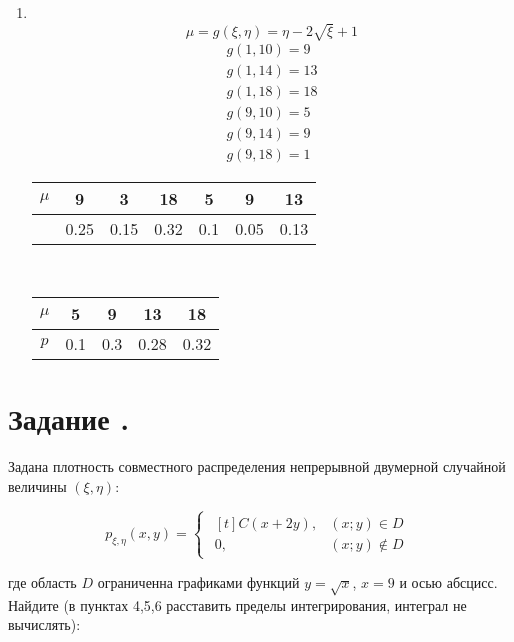 \documentclass[12pt]{article}
\begin{document}
\begin{enumerate}
	\item \mbox{}\\
	      \[\mu = g(\xi, \eta) = \eta - 2 \sqrt{\xi} + 1\]
	      \begin{gather*}
		      g(1, 10) = 9 \\
		      g(1, 14) = 13 \\
		      g(1, 18) = 18 \\
		      g(9, 10) = 5 \\
		      g(9, 14) = 9 \\
		      g(9, 18) = 1
	      \end{gather*}
	      \begin{tabular}{|c|c|c|c|c|c|c|}
		      \hline
		      $\mu$ & 9    & 3    & 18   & 5   & 9    & 13   \\
		      \hline
		            & 0.25 & 0.15 & 0.32 & 0.1 & 0.05 & 0.13 \\
		      \hline
	      \end{tabular} \\
	      \begin{tabular}{|c|c|c|c|c|}
		      \hline
		      $\mu$ & 5   & 9   & 13   & 18   \\
		      \hline
		      $p$   & 0.1 & 0.3 & 0.28 & 0.32 \\
		      \hline
	      \end{tabular}
\end{enumerate}

\section*{Задание .}

Задана плотность совместного распределения непрерывной двумерной случайной величины $(\xi,\eta)$:

\begin{equation*}
	p_{\xi,\eta}(x,y) =
	\begin{cases}
		\begin{aligned}[t]
			C(x + 2y), & (x;y) \in D    \\
			0,         & (x;y) \notin D
		\end{aligned}
	\end{cases}
\end{equation*}

где область $D$ ограниченна графиками функций $y = \sqrt{x}$, $x = 9$ и осью абсцисс.
Найдите (в пунктах 4,5,6 расставить пределы интегрирования, интеграл не вычислять):
\end{document}
